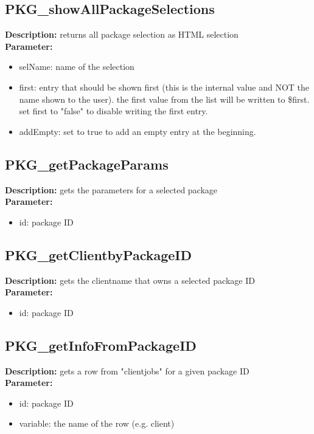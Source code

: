 \subsection{PKG\_showAllPackageSelections}
\textbf{Description:} returns all package selection as HTML selection\\
\textbf{Parameter:}
\begin{itemize}
\item selName: name of the selection
\item first: entry that should be shown first (this is the internal value and NOT the name shown to the user). the first value from the list will be written to \$first. set first to "false" to disable writing the first entry.
\item addEmpty: set to true to add an empty entry at the beginning.
\end{itemize}

\subsection{PKG\_getPackageParams}
\textbf{Description:} gets the parameters for a selected package\\
\textbf{Parameter:}
\begin{itemize}
\item id: package ID
\end{itemize}

\subsection{PKG\_getClientbyPackageID}
\textbf{Description:} gets the clientname that owns a selected package ID\\
\textbf{Parameter:}
\begin{itemize}
\item id: package ID
\end{itemize}

\subsection{PKG\_getInfoFromPackageID}
\textbf{Description:} gets a row from "clientjobs" for a given package ID\\
\textbf{Parameter:}
\begin{itemize}
\item id: package ID
\item variable: the name of the row (e.g. client)
\end{itemize}

